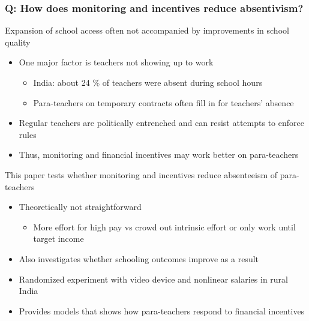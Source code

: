 \documentclass[aspectratio=169]{beamer}
\begin{document}
\begin{frame}
\frametitle{Q: How does monitoring and incentives reduce absentivism?}
Expansion of school access often not accompanied by improvements in school quality
\begin{itemize}\setlength\itemsep{3pt}
\item One major factor is teachers not showing up to work
\begin{itemize}\setlength\itemsep{3pt}
\item India: about 24 \% of teachers were absent during school hours
\item Para-teachers on temporary contracts often fill in for teachers' absence
\end{itemize}
\item Regular teachers are politically entrenched and can resist attempts to enforce rules
\item Thus, monitoring and financial incentives may work better on para-teachers
\end{itemize}\medskip
This paper tests whether monitoring and incentives reduce absenteeism of para-teachers
\begin{itemize}\setlength\itemsep{3pt}
\item Theoretically not straightforward
\begin{itemize}\setlength\itemsep{3pt}
\item More effort for high pay vs crowd out intrinsic effort or only work until target income
\end{itemize}
\item Also investigates whether schooling outcomes improve as a result
\item Randomized experiment with video device and nonlinear salaries in rural India
\item Provides models that shows how para-teachers respond to financial incentives
\end{itemize}
\end{frame}
\end{document}
